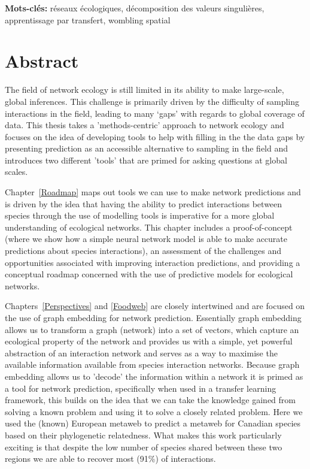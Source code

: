 \documentclass[12pt,oneside,phd]{dms}
\numberwithin{equation}{section}
\numberwithin{table}{chapter}
\numberwithin{figure}{chapter}
\begin{document}
\textbf{Mots-clés:} réseaux écologiques, décomposition des valeurs singulières, apprentissage par transfert, wombling spatial


\anglais
\chapter*{Abstract}

The field of network ecology is still limited in its ability to make large-scale, global inferences. This challenge is primarily driven by the difficulty of sampling interactions in the field, leading to many ‘gaps’ with regards to global coverage of data. This thesis takes a 'methods-centric' approach to network ecology and focuses on the idea of developing tools to help with filling in the the data gaps by presenting prediction as an accessible alternative to sampling in the field and introduces two different 'tools' that are primed for asking questions at global scales.

Chapter~\ref{Roadmap} maps out tools we can use to make network predictions and is driven by the idea that having the ability to predict interactions between species through the use of modelling tools is imperative for a more global understanding of ecological networks. This chapter includes a proof-of-concept (where we show how a simple neural network model is able to make accurate predictions about species interactions), an assessment of the challenges and opportunities associated with improving interaction predictions, and providing a conceptual roadmap concerned with the use of predictive models for ecological networks.

Chapters~\ref{Perspectives} and \ref{Foodweb} are closely intertwined and are focused on the use of graph embedding for network prediction. Essentially graph embedding allows us to transform a graph (network) into a set of vectors, which capture an ecological property of the network and provides us with a simple, yet powerful abstraction of an interaction network and serves as a way to maximise the available information available from species interaction networks. Because graph embedding allows us to 'decode' the information within a network it is primed as a tool for network prediction, specifically when used in a transfer learning framework, this builds on the idea that we can take the knowledge gained from solving a known problem and using it to solve a closely related problem. Here we used the (known) European metaweb to predict a metaweb for Canadian species based on their phylogenetic relatedness. What makes this work particularly exciting is that despite the low number of species shared between these two regions we are able to recover most (91\%) of interactions. 
\end{document}
